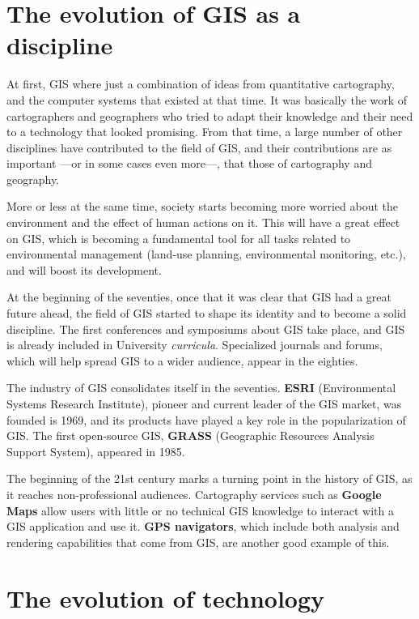 \section{The evolution of GIS as a discipline}

At first, GIS where just a combination of ideas from quantitative cartography, and the computer systems that existed at that time. It was basically the work of cartographers and geographers who tried to adapt their knowledge and their need to a technology that looked promising. From that time, a large number of other disciplines have contributed to the field of GIS, and their contributions are as important ---or in some cases even more---, that those of cartography and geography.

More or less at the same time, society starts becoming more worried about the environment and the effect of human actions on it. This will have a great effect on GIS, which is becoming a fundamental tool for all tasks related to environmental management (land-use planning, environmental monitoring, etc.), and will boost its development.

At the beginning of the seventies, once that it was clear that GIS had a great future ahead, the field of GIS started to shape its identity and to become a solid discipline. The first conferences and symposiums about GIS take place, and GIS is already included in University \emph{curricula}. Specialized journals and forums, which will help spread GIS to a wider audience, appear in the eighties.

The industry of GIS consolidates itself in the seventies. \textbf{ESRI} (Environmental Systems Research Institute), pioneer and current leader of the GIS market, was founded is 1969, and its products have played a key role in the popularization of GIS. The first open-source GIS, \textbf{GRASS} (Geographic Resources Analysis Support System), appeared in 1985.

The beginning of the 21st century marks a turning point in the history of GIS, as it reaches non-professional audiences. Cartography services such as  \textbf{Google Maps} allow users with little or no technical GIS knowledge to interact with a GIS application and use it. \textbf{GPS navigators}, which include both analysis and rendering capabilities that come from GIS, are another good example of this.

\section{The evolution of technology}

